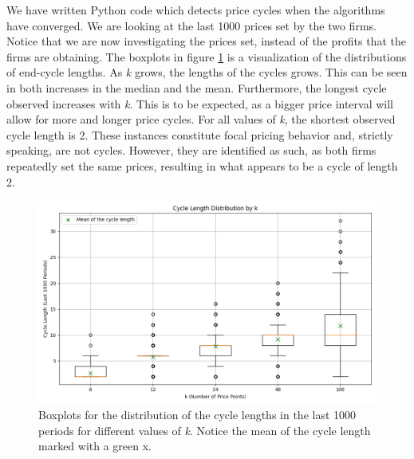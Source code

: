 \documentclass{article}
\begin{document}
We have written Python code which detects price cycles when the algorithms have converged. We are looking at the last 1000 prices set by the two firms. Notice that we are now investigating the prices set, instead of the profits that the firms are obtaining. 
\newline
The boxplots in figure \ref{fig:Boxplot} is a visualization of the distributions of end-cycle lengths. As \textit{k} grows, the lengths of the cycles grows. This can be seen in both increases in the median and the mean. Furthermore, the longest cycle observed increases with \textit{k}. This is to be expected, as a bigger price interval will allow for more and longer price cycles.
\newline
For all values of \textit{k}, the shortest observed cycle length is 2. These instances constitute focal pricing behavior and, strictly speaking, are not cycles. However, they are identified as such, as both firms repeatedly set the same prices, resulting in what appears to be a cycle of length 2.

\begin{figure}[H]
    \centering
    \includegraphics[scale = 0.5]{Boxplotv3.png}
    \caption{Boxplots for the distribution of the cycle lengths in the last 1000 periods for different values of \textit{k}. Notice the mean of the cycle length marked with a green x.}
    \label{fig:Boxplot}
\end{figure}
\end{document}
